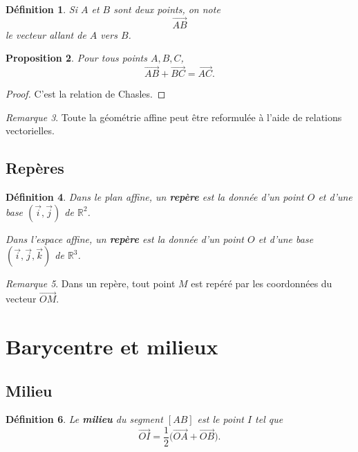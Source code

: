 \documentclass[11pt,a4paper]{article}
\newtheorem{definition}{Définition}[section]
\newtheorem{proposition}[definition]{Proposition}
\theoremstyle{remark}
\newtheorem{remarque}[definition]{Remarque}
\newcommand{\R}{\mathbb{R}}
\begin{document}
\begin{definition}
Si \(A\) et \(B\) sont deux points, on note
\[
\overrightarrow{AB}
\]
le vecteur allant de \(A\) vers \(B\).
\end{definition}

\begin{proposition}
Pour tous points \(A,B,C\),
\[
\overrightarrow{AB}+\overrightarrow{BC}=\overrightarrow{AC}.
\]
\end{proposition}

\begin{proof}
C’est la relation de Chasles.
\end{proof}

\begin{remarque}
Toute la géométrie affine peut être reformulée à l’aide de relations vectorielles.
\end{remarque}

\subsection{Repères}

\begin{definition}
Dans le plan affine, un \textbf{repère} est la donnée d’un point \(O\) et d’une base \((\vec{i},\vec{j})\) de \(\R^2\).

Dans l’espace affine, un \textbf{repère} est la donnée d’un point \(O\) et d’une base \((\vec{i},\vec{j},\vec{k})\) de \(\R^3\).
\end{definition}

\begin{remarque}
Dans un repère, tout point \(M\) est repéré par les coordonnées du vecteur \(\overrightarrow{OM}\).
\end{remarque}

\section{Barycentre et milieux}

\subsection{Milieu}

\begin{definition}
Le \textbf{milieu} du segment \([AB]\) est le point \(I\) tel que
\[
\overrightarrow{OI}=\frac12\big(\overrightarrow{OA}+\overrightarrow{OB}\big).
\]
\end{definition}
\end{document}
